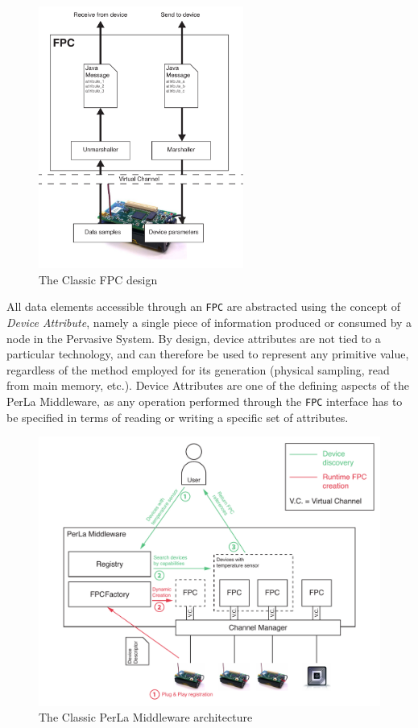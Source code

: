 \begin{figure}[h!]
\center
\includegraphics[width=0.6\textwidth]{imgs/classic_fpc.pdf}
\caption{The Classic FPC design}
\label{fig:classic_fpc}
\end{figure}

All data elements accessible through an \texttt{FPC} are abstracted using the
concept of \textit{Device Attribute}, namely a single piece of information
produced or consumed by a node in the Pervasive System. By design, device
attributes are not tied to a particular technology, and can therefore be used
to represent any primitive value, regardless of the method employed for its
generation (physical sampling, read from main memory, etc.). Device Attributes
are one of the defining aspects of the PerLa Middleware, as any operation
performed through the \texttt{FPC} interface has to be specified in terms of
reading or writing a specific set of attributes.

\begin{figure}[h!]
\includegraphics[width=\textwidth]{imgs/classic_middleware_overview.pdf}
\caption{The Classic PerLa Middleware architecture}
\label{fig:classic_architecture}
\end{figure}

